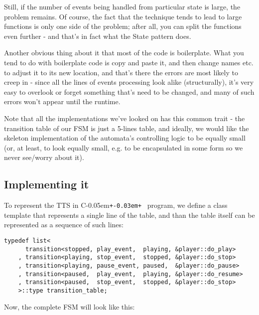\documentclass{kapproc}
\newcommand{\Cpp}{C\kern-0.05em\texttt{+\kern-0.03em+}%
}
\begin{document}
Still, if the number of events being handled from particular 
state is large, the problem remains. Of course, the fact that 
the technique tends to lead to large functions is only one 
side of the problem; after all, you can split the functions 
even further - and that's in fact what the State pattern does.

Another obvious thing about it that most of the code is 
boilerplate. What you tend to do with boilerplate code is copy 
and paste it, and then change names etc. to adjust it to its new 
location, and that's there the errors are most likely to creep in
- since all the lines of events processing look alike 
(structurally), it's very easy to overlook or forget something 
that's need to be changed, and many of such errors won't appear 
until the runtime.

Note that all the implementations we've looked on has this common 
trait - the transition table of our FSM is just a 5-lines table, 
and ideally, we would like the skeleton implementation of the 
automata's controlling logic to be equally small (or, at least, 
to look equally small, e.g. to be encapsulated in some form so 
we never see/worry about it). 

\subsection{Implementing it}

To represent the TTS in \Cpp\ program, we define 
a  class template that represents a single line 
of the table, and than the table itself can be represented as a 
sequence of such lines:

{\small
\begin{codesamp}\begin{verbatim}
typedef list<
      transition<stopped, play_event,  playing, &player::do_play>
    , transition<playing, stop_event,  stopped, &player::do_stop>
    , transition<playing, pause_event, paused,  &player::do_pause>
    , transition<paused,  play_event,  playing, &player::do_resume>
    , transition<paused,  stop_event,  stopped, &player::do_stop>
    >::type transition_table;
\end{verbatim}
\end{codesamp}
}

Now, the complete FSM will look like this:
\end{document}
